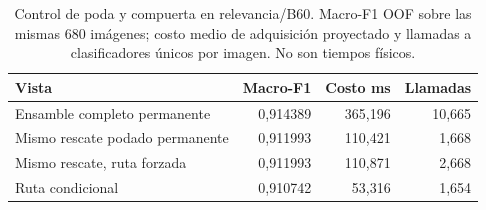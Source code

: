 \begin{table}[!htbp]
\centering\small
\caption{Control de poda y compuerta en relevancia/B60. Macro-F1 OOF sobre las mismas 680 imágenes; costo medio de adquisición proyectado y llamadas a clasificadores únicos por imagen. No son tiempos físicos.}
\label{tab:p0-b60}
\begin{tabular}{@{}lrrr@{}}
\toprule
Vista & Macro-F1 & Costo ms & Llamadas\\
\midrule
Ensamble completo permanente & 0,914389 & 365,196 & 10,665\\
Mismo rescate podado permanente & 0,911993 & 110,421 & 1,668\\
Mismo rescate, ruta forzada & 0,911993 & 110,871 & 2,668\\
Ruta condicional & 0,910742 & 53,316 & 1,654\\
\bottomrule
\end{tabular}
\end{table}
